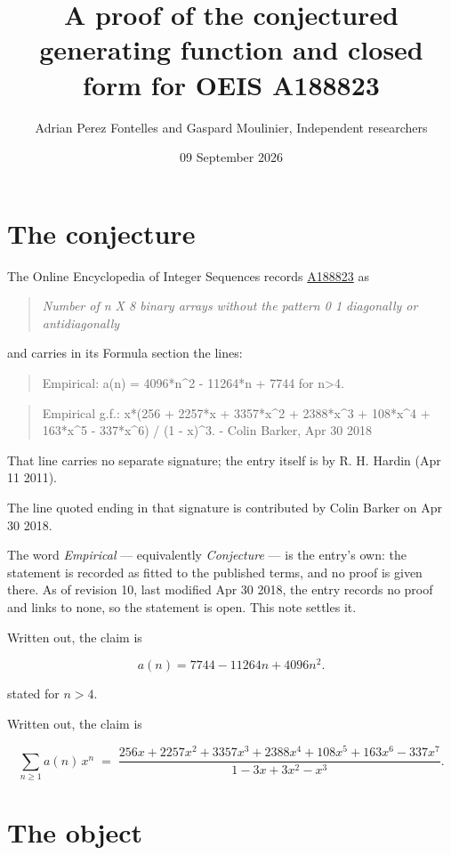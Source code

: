 \documentclass[11pt]{article}
\title{A proof of the conjectured generating function and closed form for OEIS A188823}
\author{Adrian Perez Fontelles and Gaspard Moulinier, Independent researchers}
\date{09 September 2026}
\theoremstyle{definition}
\begin{document}
\maketitle
\section{The conjecture}

The Online Encyclopedia of Integer Sequences records \href{https://oeis.org/A188823}{A188823} as

\begin{quote}\itshape Number of n X 8 binary arrays without the pattern 0 1 diagonally or antidiagonally\end{quote}

and carries in its Formula section the lines:

\begin{quote}\ttfamily Empirical: a(n) = 4096*n\textasciicircum{}2 - 11264*n + 7744 for n>4.\end{quote}

\begin{quote}\ttfamily Empirical g.f.: x*(256 + 2257*x + 3357*x\textasciicircum{}2 + 2388*x\textasciicircum{}3 + 108*x\textasciicircum{}4 + 163*x\textasciicircum{}5 - 337*x\textasciicircum{}6) / (1 - x)\textasciicircum{}3. - Colin Barker, Apr 30 2018\end{quote}

That line carries no separate signature; the entry itself is by R. H. Hardin (Apr 11 2011).

The line quoted ending in that signature is contributed by Colin Barker on Apr 30 2018.

The word {\itshape Empirical} --- equivalently {\itshape Conjecture} --- is the entry's own: the statement is recorded as fitted to the published terms, and no proof is given there. As of revision 10, last modified Apr 30 2018, the entry records no proof and links to none, so the statement is open. This note settles it.

Written out, the claim is

\[a(n) = 7744 - 11264n + 4096n^{2}.\]

stated for $n > 4$.

Written out, the claim is

\[\sum_{n \ge 1} a(n)\,x^n \;=\; \frac{256x + 2257x^{2} + 3357x^{3} + 2388x^{4} + 108x^{5} + 163x^{6} - 337x^{7}}{1 - 3x + 3x^{2} - x^{3}}.\]

\section{The object}
\end{document}
